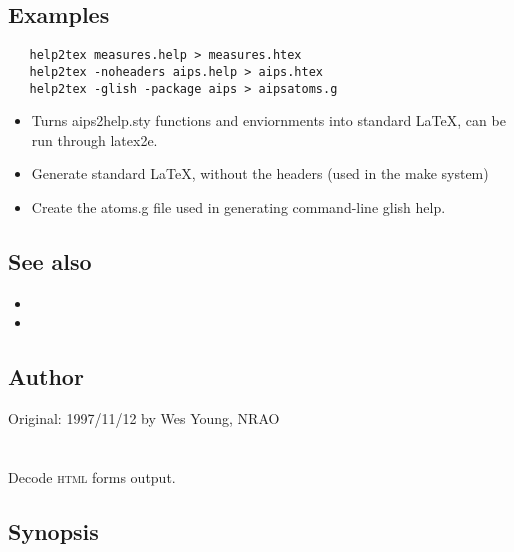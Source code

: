 \subsection*{Examples}

\begin{verbatim}
   help2tex measures.help > measures.htex
   help2tex -noheaders aips.help > aips.htex
   help2tex -glish -package aips > aipsatoms.g
\end{verbatim}

\noindent
\begin{itemize}
\item Turns aips2help.sty functions and enviornments into standard LaTeX, can
be run through latex2e.
\item Generate standard LaTeX, without the headers (used in the make system)
\item Create the atoms.g file used in generating command-line glish help.
\end{itemize}
 
\subsection*{See also}
\begin{itemize}
\item {} 
\item {}
\end{itemize}
 
\subsection*{Author}
 
Original: 1997/11/12 by Wes Young, NRAO

\newpage
\section{}
\label{parseform}

Decode \textsc{html} forms output.

\subsection*{Synopsis}
 
